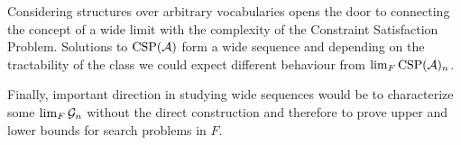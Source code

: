 Considering structures over arbitrary vocabularies opens the door to connecting the concept of a wide limit with the complexity of the Constraint Satisfaction Problem. Solutions to $\text{CSP}(\mathcal{A})$ form a wide sequence and depending on the tractability of the class we could expect different behaviour from $\lim_{F}\text{CSP}(\mathcal{A})_n$.

Finally, important direction in studying wide sequences would be to characterize some $\lim_F\mathcal{G}_n$ without the direct construction and therefore to prove upper and lower bounds for search problems in $F$.
